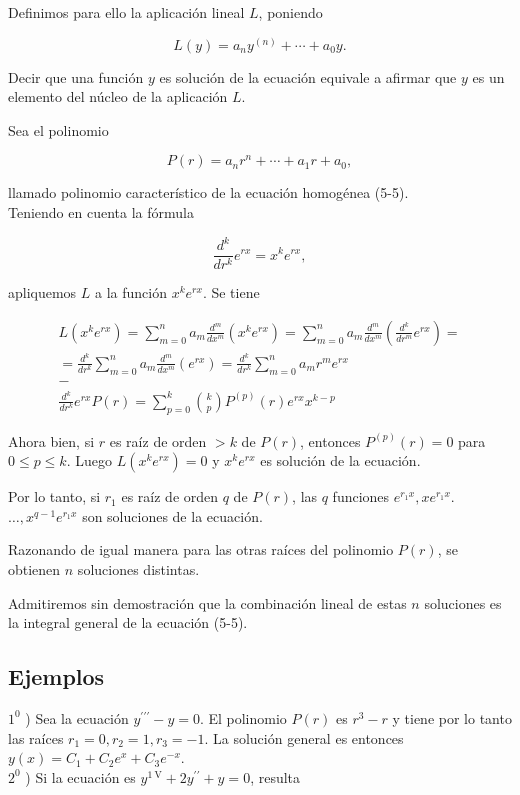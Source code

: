 \documentclass[10pt]{article}
\theoremstyle{plain}
\theoremstyle{definition}
\theoremstyle{remark}
\begin{document}
Definimos para ello la aplicación lineal $L$, poniendo


\begin{equation*}
L(y)=a_{n} y^{(n)}+\cdots+a_{0} y . \tag{5-6}
\end{equation*}


Decir que una función $y$ es solución de la ecuación equivale a afirmar que $y$ es un elemento del núcleo de la aplicación $L$.

Sea el polinomio

$$
P(r)=a_{n} r^{n}+\cdots+a_{1} r+a_{0},
$$

llamado polinomio característico de la ecuación homogénea (5-5).\\
Teniendo en cuenta la fórmula

$$
\frac{d^{k}}{d r^{k}} e^{r x}=x^{k} e^{r x},
$$

apliquemos $L$ a la función $x^{k} e^{r x}$. Se tiene

$$
\begin{gathered}
L\left(x^{k} e^{r x}\right)=\sum_{m=0}^{n} a_{m} \frac{d^{m}}{d x^{m}}\left(x^{k} e^{r x}\right)=\sum_{m=0}^{n} a_{m} \frac{d^{m}}{d x^{m}}\left(\frac{d^{k}}{d r^{m}} e^{r x}\right)= \\
=\frac{d^{k}}{d r^{k}} \sum_{m=0}^{n} a_{m} \frac{d^{m}}{d x^{m}}\left(e^{r x}\right)=\frac{d^{k}}{d r^{k}} \sum_{m=0}^{n} a_{m} r^{m} e^{r x} \\
- \\
\frac{d^{k}}{d r^{k}} e^{r x} P(r)=\sum_{p=0}^{k}\binom{k}{p} P^{(p)}(r) e^{r x} x^{k-p}
\end{gathered}
$$

Ahora bien, si $r$ es raíz de orden $>k$ de $P(r)$, entonces $P^{(p)}(r)=0$ para $0 \leqslant p \leqslant k$. Luego $L\left(x^{k} e^{r x}\right)=0$ y $x^{k} e^{r x}$ es solución de la ecuación.

Por lo tanto, si $r_{1}$ es raíz de orden $q$ de $P(r)$, las $q$ funciones $e^{r_{1} x}, x e^{r_{1} x}$. $\ldots, x^{q-1} e^{r_{1} x}$ son soluciones de la ecuación.

Razonando de igual manera para las otras raíces del polinomio $P(r)$, se obtienen $n$ soluciones distintas.

Admitiremos sin demostración que la combinación lineal de estas $n$ soluciones es la integral general de la ecuación (5-5).

\subsection*{Ejemplos}
$1^{0}$ ) Sea la ecuación $y^{\prime \prime \prime}-y=0$. El polinomio $P(r)$ es $r^{3}-r$ y tiene por lo tanto las raíces $r_{1}=0, r_{2}=1, r_{3}=-1$. La solución general es entonces $y(x)=C_{1}+C_{2} e^{x}+C_{3} e^{-x}$.\\
$2^{0}$ ) Si la ecuación es $y^{1 \mathrm{~V}}+2 y^{\prime \prime}+y=0$, resulta
\end{document}
